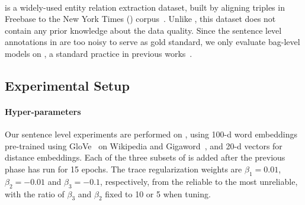 \paragraph{\EntityRE} is a widely-used entity
relation extraction dataset, built %
by aligning triples
in Freebase to the New York Times (\NYT) corpus~\cite{riedel2010modeling}.
Unlike \TimeRE, this dataset does not contain any prior knowledge about the data quality.
Since the sentence level annotations in %
 \EntityRE are too noisy to serve as gold standard,  we only evaluate bag-level models on \EntityRE, a standard practice in previous works~\cite{surdeanu2012multi,zeng2015distant,lin2016neural}.


\subsection{Experimental Setup}
%
%
\paragraph{Hyper-parameters}
%
%
Our sentence level experiments are performed on \TimeRE,
using %
100-d word embeddings pre-trained using GloVe~\cite{pennington2014glove} on Wikipedia and Gigaword~\cite{gigaword},
and 20-d vectors for distance embeddings. Each of the three subsets of \TimeRE is added after the previous phase has run for 15 epochs. The trace regularization weights are $\beta_1=0.01$, $\beta_2=-0.01$ and $\beta_3=-0.1$, respectively, from the reliable to the most unreliable, with the ratio of $\beta_3$ and $\beta_2$ fixed to 10 or 5 when tuning.

